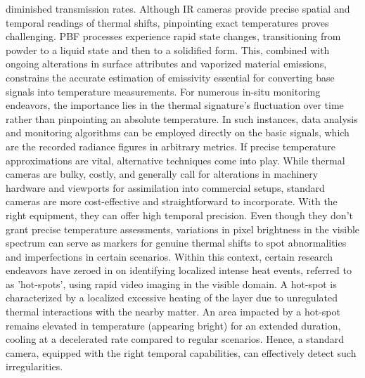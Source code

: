 diminished transmission rates. Although IR cameras provide precise spatial and temporal readings of thermal shifts, pinpointing exact temperatures proves challenging. PBF processes experience rapid state changes, transitioning from powder to a liquid state and then to a solidified form. This, combined with ongoing alterations in surface attributes and vaporized material emissions, constrains the accurate estimation of emissivity essential for converting base signals into temperature measurements. For numerous in-situ monitoring endeavors, the importance lies in the thermal signature's fluctuation over time rather than pinpointing an absolute temperature. In such instances, data analysis and monitoring algorithms can be employed directly on the basic signals, which are the recorded radiance figures in arbitrary metrics. If precise temperature approximations are vital, alternative techniques come into play. While thermal cameras are bulky, costly, and generally call for alterations in machinery hardware and viewports for assimilation into commercial setups, standard cameras are more cost-effective and straightforward to incorporate. With the right equipment, they can offer high temporal precision. Even though they don't grant precise temperature assessments, variations in pixel brightness in the visible spectrum can serve as markers for genuine thermal shifts to spot abnormalities and imperfections in certain scenarios. Within this context, certain research endeavors have zeroed in on identifying localized intense heat events, referred to as 'hot-spots', using rapid video imaging in the visible domain. A hot-spot is characterized by a localized excessive heating of the layer due to unregulated thermal interactions with the nearby matter. An area impacted by a hot-spot remains elevated in temperature (appearing bright) for an extended duration, cooling at a decelerated rate compared to regular scenarios. Hence, a standard camera, equipped with the right temporal capabilities, can effectively detect such irregularities.
